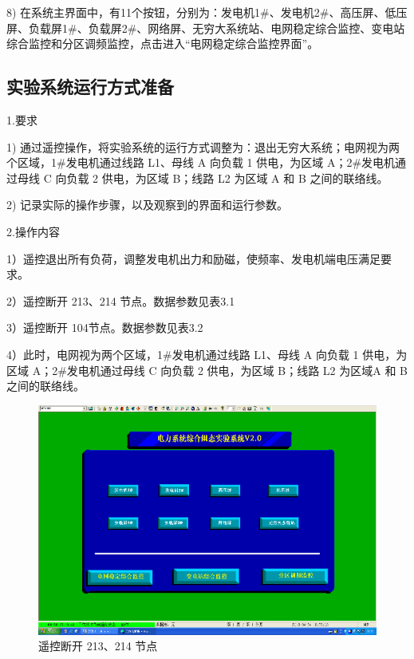 \documentclass[a4paper]{ctexrep}
\begin{document}
                        8) 在系统主界面中，有11个按钮，分别为：发电机1\#、发电机2\#、高压屏、低压屏、负载屏1\#、负载屏2\#、网络屏、无穷大系统站、电网稳定综合监控、变电站综合监控和分区调频监控，点击进入“电网稳定综合监控界面”。

                    \subsection{实验系统运行方式准备}
                        \noindent 1.要求
                        
                        1) 通过遥控操作，将实验系统的运行方式调整为：退出无穷大系统；电网视为两个区域，1\#发电机通过线路 L1、母线 A 向负载 1 供电，为区域 A；2\#发电机通过母线 C 向负载 2 供电，为区域 B；线路 L2 为区域 A 和 B 之间的联络线。
                       
                        2) 记录实际的操作步骤，以及观察到的界面和运行参数。
                        
                        \noindent 2.操作内容
                        
                        1）遥控退出所有负荷，调整发电机出力和励磁，使频率、发电机端电压满足要求。
                       
                        2）遥控断开 213、214 节点。数据参数见表3.1

                        3）遥控断开 104节点。数据参数见表3.2

                        4）此时，电网视为两个区域，1\#发电机通过线路 L1、母线 A 向负载 1 供电，为区域 A；2\#发电机通过母线 C 向负载 2 供电，为区域 B；线路 L2 为区域A 和 B 之间的联络线。

                        \begin{figure}[htbp]
                            \centering
                            \includegraphics[width=12cm]{3.png}
                            \caption{遥控断开 213、214 节点}
                        \end{figure}
\end{document}
